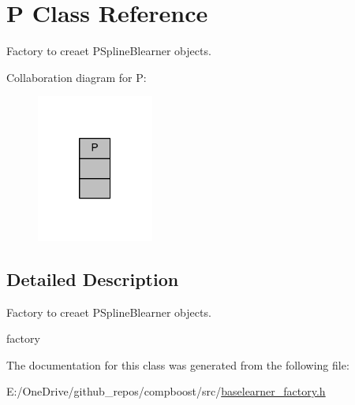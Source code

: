 \hypertarget{class_p}{}\section{P Class Reference}
\label{class_p}


Factory to creaet {\ttfamily P\+Spline\+Blearner} objects.  




Collaboration diagram for P\+:
\nopagebreak
\begin{figure}[H]
\begin{center}
\leavevmode
\includegraphics[width=109pt]{class_p__coll__graph}
\end{center}
\end{figure}


\subsection{Detailed Description}
Factory to creaet {\ttfamily P\+Spline\+Blearner} objects. 

factory 

The documentation for this class was generated from the following file\+:\begin{DoxyCompactItemize}
\item 
E\+:/\+One\+Drive/github\+\_\+repos/compboost/src/\mbox{\hyperlink{baselearner__factory_8h}{baselearner\+\_\+factory.\+h}}\end{DoxyCompactItemize}
